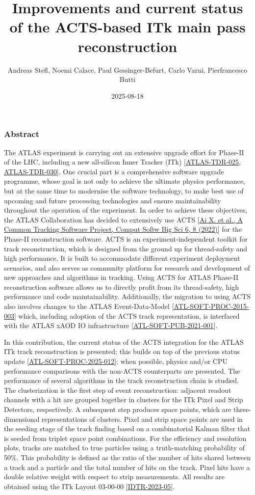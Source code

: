 \documentclass[aspectratio=169]{beamer}
\title{Improvements and current status of the ACTS-based ITk main pass reconstruction}
\author{Andreas Stefl, Noemi Calace, Paul Gessinger-Befurt, Carlo Varni, Pierfrancesco Butti}
\institute{CERN}
\date{2025-08-18}
\begin{document}
\frame{\titlepage}

\begin{frame}
\frametitle{Abstract}
\tiny
The ATLAS experiment is carrying out an extensive upgrade effort for Phase-II of the LHC, including a new all-silicon Inner Tracker (ITk) [\href{https://cds.cern.ch/record/2257755}{ATLAS-TDR-025}, \href{https://cds.cern.ch/record/2285585}{ATLAS-TDR-030}]. One crucial part is a comprehensive software upgrade programme, whose goal is not only to achieve the ultimate physics performance, but at the same time to modernise the software technology, to make best use of upcoming and future processing technologies and ensure maintainability throughout the operation of the experiment. In order to achieve these objectives, the ATLAS Collaboration has decided to extensively use ACTS [\href{https://doi.org/10.1007/s41781-021-00078-8}{Ai X. et al., A Common Tracking Software Project, Comput Softw Big Sci 6, 8 (2022)}] for the Phase-II reconstruction software. ACTS is an experiment-independent toolkit for track reconstruction, which is designed from the ground up for thread-safety and high performance. It is built to accommodate different experiment deployment scenarios, and also serves as community platform for research and development of new approaches and algorithms in tracking. Using ACTS for ATLAS Phase-II reconstruction software allows us to directly profit from its thread-safety, high performance and code maintainability. Additionally, the migration to using ACTS also involves changes to the ATLAS Event-Data-Model [\href{https://cds.cern.ch/record/2014150}{ATL-SOFT-PROC-2015-003}] which, including adoption of the ACTS track representation, is interfaced with the ATLAS xAOD IO infrastructure [\href{https://cds.cern.ch/record/2767187}{ATL-SOFT-PUB-2021-001}].

In this contribution, the current status of the ACTS integration for the ATLAS ITk track reconstruction is presented; this builds on top of the previous status update [\href{https://cds.cern.ch/record/2921878}{ATL-SOFT-PROC-2025-012}]; when possible, physics and/or CPU performance comparisons with the non-ACTS counterparts are presented. The performance of several algorithms in the track reconstruction chain is studied. The clusterization is the first step of event reconstruction: adjacent readout channels with a hit are grouped together in clusters for the ITk Pixel and Strip Detectors, respectively. A subsequent step produces space points, which are three-dimensional representations of clusters. Pixel and strip space points are used in the seeding stage of the track finding based on a combinatorial Kalman filter that is seeded from triplet space point combinations. For the efficiency and resolution plots, tracks are matched to true particles using a truth-matching probability of 50\%. This probability is defined as the ratio of the number of hits shared between a track and a particle and the total number of hits on the track. Pixel hits have a double relative weight with respect to strip measurements. All results are obtained using the ITk Layout 03-00-00 [\href{https://atlas.web.cern.ch/Atlas/GROUPS/PHYSICS/PLOTS/IDTR-2023-05}{IDTR-2023-05}].


\end{frame}
\end{document}

